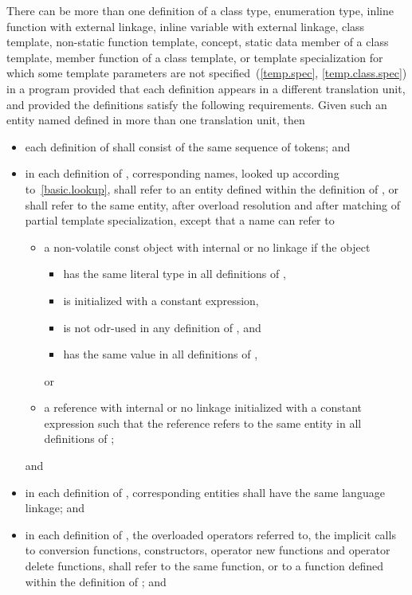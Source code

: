 \pnum
There can be more than one definition of a class type,
enumeration type, inline function
with external linkage, inline variable with external
linkage, class template,
non-static function template,
concept,
static data member of a class template, member
function of a class template, or template
specialization for which some template parameters are not
specified~(\ref{temp.spec}, \ref{temp.class.spec}) in a program provided
that each definition appears in a different translation unit, and
provided the definitions satisfy the following requirements. Given such
an entity named  defined in more than one translation unit,
then
\begin{itemize}
\item each definition of  shall consist of the same sequence of
tokens; and
\item in each definition of , corresponding names, looked up
according to~\ref{basic.lookup}, shall refer to an entity defined within
the definition of , or shall refer to the same entity, after
overload resolution and after matching of partial
template specialization, except that a name can refer to
\begin{itemize}
\item
a non-volatile const object with internal or no linkage if the object
\begin{itemize}
\item has the same literal type in all definitions of ,
\item is initialized with a constant expression,
\item is not odr-used in any definition of , and
\item has the same value in all definitions of ,
\end{itemize}
or
\item
a reference with internal or no linkage
initialized with a constant expression such that
the reference refers to the same entity in all definitions of ;
\end{itemize}
and

\item in each definition of , corresponding entities shall have the
same language linkage; and

\item in each definition of , the overloaded operators referred
to, the implicit calls to conversion functions, constructors, operator
new functions and operator delete functions, shall refer to the same
function, or to a function defined within the definition of ;
and


\end{itemize}
